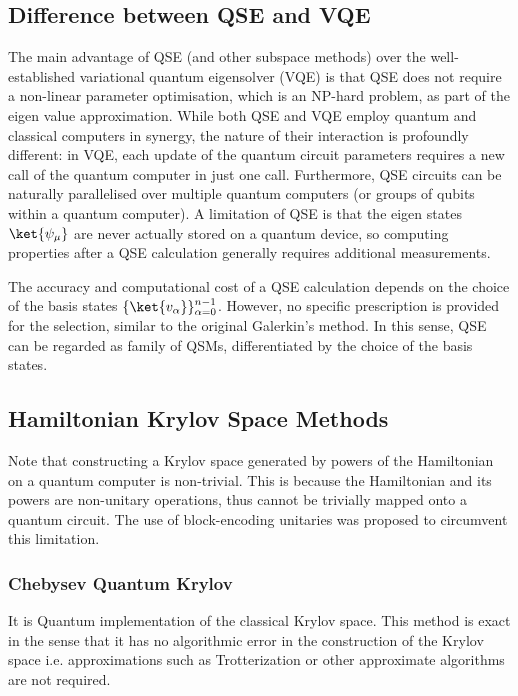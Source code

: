 \documentclass[12pt, oneside]{book}
\theoremstyle{definition}
\theoremstyle{definition}
\theoremstyle{remark}
\begin{document}
\subsection{Difference between QSE and VQE}
The main advantage of QSE (and other subspace methods) over the well-established variational quantum eigensolver (VQE) is that QSE does not require a non-linear parameter optimisation, which is an NP-hard problem, as part of the eigen value approximation. While both QSE and VQE employ quantum and classical computers in synergy, the nature of their interaction is profoundly different: in VQE, each update of the quantum circuit parameters requires a new call of the quantum computer in just one call. Furthermore, QSE circuits can be naturally parallelised over multiple quantum computers (or groups of qubits within a quantum computer). A limitation of QSE is that the eigen states $\ket{\psi_{\mu}}$ are never actually stored on a quantum device, so computing properties after a QSE calculation generally requires additional measurements.

The accuracy and computational cost of a QSE calculation depends on the choice of the basis states $\{\ket{v_{\alpha}}\}_{\alpha=0}^{n-1}$. However, no specific prescription is provided for the selection, similar to the original Galerkin's method. In this sense, QSE can be regarded as family of QSMs, differentiated by the choice of the basis states.

\subsection{Hamiltonian Krylov Space Methods}
Note that constructing a Krylov space generated by powers of the Hamiltonian on a quantum computer is non-trivial. This is because the Hamiltonian and its powers are non-unitary operations, thus cannot be trivially mapped onto a quantum circuit. The use of block-encoding unitaries was proposed to circumvent this limitation.

\subsubsection{Chebysev Quantum Krylov}
It is Quantum implementation of the classical Krylov space. This method is exact in the sense that it has no algorithmic error in the construction of the Krylov space i.e. approximations such as Trotterization or other approximate algorithms are not required. 
\end{document}
